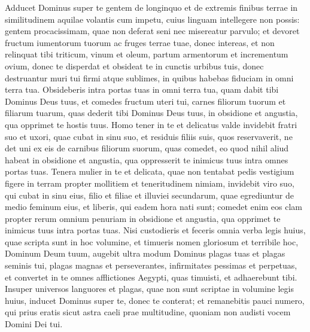 \begin{biblechapter}
\begin{biblechapter}
\begin{biblechapter}
\begin{biblechapter}
\begin{biblechapter}
\begin{biblechapter}
\begin{biblechapter}
\begin{biblechapter}
\begin{biblechapter}
\begin{biblechapter}
\begin{biblechapter}
\begin{biblechapter}
\begin{biblechapter}
\begin{biblechapter}
\begin{biblechapter}
\begin{biblechapter}
\begin{biblechapter}
\begin{biblechapter}
\begin{biblechapter}
\begin{biblechapter}
\begin{biblechapter}
\begin{biblechapter}
\begin{biblechapter}
\begin{biblechapter}
\begin{biblechapter}
\begin{biblechapter}
\begin{biblechapter}
\begin{biblechapter}
 \verse Adducet Dominus super te gentem de longinquo et de extremis finibus terrae in similitudinem aquilae volantis cum impetu, cuius linguam intellegere non possis: 
\verse gentem procacissimam, quae non deferat seni nec misereatur parvulo; 
 \verse et devoret fructum iumentorum tuorum ac fruges terrae tuae, donec intereas, et non relinquat tibi triticum, vinum et oleum, partum armentorum et incrementum ovium, donec te disperdat 
\verse et obsideat te in cunctis urbibus tuis, donec destruantur muri tui firmi atque sublimes, in quibus habebas fiduciam in omni terra tua. Obsideberis intra portas tuas in omni terra tua, quam dabit tibi Dominus Deus tuus, 
\verse et comedes fructum uteri tui, carnes filiorum tuorum et filiarum tuarum, quas dederit tibi Dominus Deus tuus, in obsidione et angustia, qua opprimet te hostis tuus. 
\verse Homo tener in te et delicatus valde invidebit fratri suo et uxori, quae cubat in sinu suo, et residuis filiis suis, quos reservaverit, 
\verse ne det uni ex eis de carnibus filiorum suorum, quas comedet, eo quod nihil aliud habeat in obsidione et angustia, qua oppresserit te inimicus tuus intra omnes portas tuas. 
\verse Tenera mulier in te et delicata, quae non tentabat pedis vestigium figere in terram propter mollitiem et teneritudinem nimiam, invidebit viro suo, qui cubat in sinu eius, filio et filiae 
\verse et illuviei secundarum, quae egrediuntur de medio feminum eius, et liberis, qui eadem hora nati sunt; comedet enim eos clam propter rerum omnium penuriam in obsidione et angustia, qua opprimet te inimicus tuus intra portas tuas.
 \verse Nisi custodieris et feceris omnia verba legis huius, quae scripta sunt in hoc volumine, et timueris nomen gloriosum et terribile hoc, Dominum Deum tuum, 
 \verse augebit ultra modum Dominus plagas tuas et plagas seminis tui, plagas magnas et perseverantes, infirmitates pessimas et perpetuas, 
\verse et convertet in te omnes afflictiones Aegypti, quas timuisti, et adhaerebunt tibi. 
\verse Insuper universos languores et plagas, quae non sunt scriptae in volumine legis huius, inducet Dominus super te, donec te conterat; 
\verse et remanebitis pauci numero, qui prius eratis sicut astra caeli prae multitudine, quoniam non audisti vocem Domini Dei tui.

\end{biblechapter}
\end{biblechapter}
\end{biblechapter}
\end{biblechapter}
\end{biblechapter}
\end{biblechapter}
\end{biblechapter}
\end{biblechapter}
\end{biblechapter}
\end{biblechapter}
\end{biblechapter}
\end{biblechapter}
\end{biblechapter}
\end{biblechapter}
\end{biblechapter}
\end{biblechapter}
\end{biblechapter}
\end{biblechapter}
\end{biblechapter}
\end{biblechapter}
\end{biblechapter}
\end{biblechapter}
\end{biblechapter}
\end{biblechapter}
\end{biblechapter}
\end{biblechapter}
\end{biblechapter}
\end{biblechapter}
